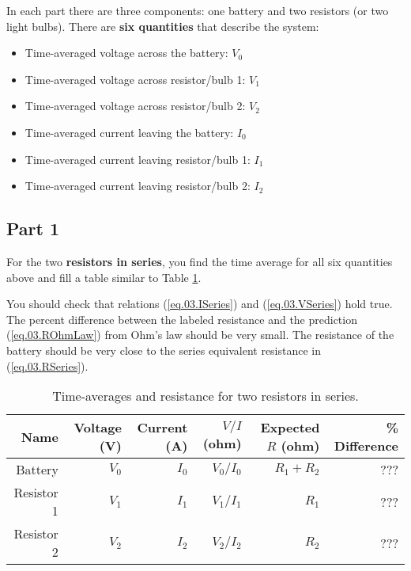 In each part there are three components: one battery and two resistors (or two light bulbs). There are \textbf{six quantities} that describe the system:
\begin{itemize}
	\item Time-averaged voltage across the battery: $V_{0}$
	\item Time-averaged voltage across resistor/bulb 1: $V_{1}$
	\item Time-averaged voltage across resistor/bulb 2: $V_{2}$
	\item Time-averaged current leaving the battery: $I_{0}$
	\item Time-averaged current leaving resistor/bulb 1: $I_{1}$
	\item Time-averaged current leaving resistor/bulb 2: $I_{2}$
\end{itemize}
\subsection{Part 1}
For the two \textbf{resistors in series}, you find the time average for all six quantities above and fill a table similar to Table \ref{table.03.resistors.series}.

You should check that relations (\ref{eq.03.ISeries}) and (\ref{eq.03.VSeries}) hold true. The percent difference between the labeled resistance and the prediction (\ref{eq.03.ROhmLaw}) from Ohm's law should be very small. The resistance of the battery should be very close to the series equivalent resistance in (\ref{eq.03.RSeries}).
\begin{table}[ht!]
	\begin{center}
		\begin{tabular}{|r|r|r|r|r|r|}
			\hline
			Name & Voltage (V) & Current (A) & $V/I$ (ohm) & Expected $R$ (ohm) & \% Difference \\
			\hline
			Battery & $V_{0}$ & $I_{0}$ & $V_{0} / I_{0}$ & $R_{1} + R_{2}$ & ??? \\
			Resistor 1 & $V_{1}$ & $I_{1}$ & $V_{1} / I_{1}$ & $R_{1}$ & ??? \\
			Resistor 2 & $V_{2}$ & $I_{2}$ & $V_{2} / I_{2}$ & $R_{2}$ & ??? \\
			\hline
		\end{tabular}
	\end{center}
	\caption{Time-averages and resistance for two resistors in series.}
	\label{table.03.resistors.series}
\end{table}
